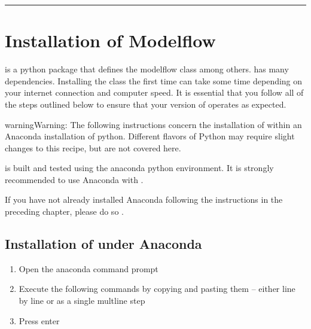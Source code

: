 \documentclass[letterpaper,10pt,english]{jupyterBook}
\begin{document}
\bigskip\hrule\bigskip


\sphinxstepscope


\section{Installation of Modelflow}
\label{\detokenize{content/03_Installation/InstallingModelFlow:installation-of-modelflow}}\label{\detokenize{content/03_Installation/InstallingModelFlow::doc}}
\sphinxAtStartPar
{} is a python package that defines the modelflow class  among others.   has many dependencies. Installing the class the first time can take some time depending on your internet connection and computer speed.  It is essential that you follow all of the steps outlined below to ensure that your version of  operates as expected.

\begin{sphinxadmonition}{warning}{Warning:}
\sphinxAtStartPar
The following instructions concern the installation of  within an Anaconda installation of python.  Different flavors of Python may require slight changes to this recipe, but are not covered here.

\sphinxAtStartPar
{} is built and tested using the anaconda python environment.  It is strongly recommended to use Anaconda with .

\sphinxAtStartPar
If you have not already installed Anaconda following the instructions in the preceding chapter, please do so .
\end{sphinxadmonition}


\subsection{Installation of  under Anaconda}
\label{\detokenize{content/03_Installation/InstallingModelFlow:installation-of-modelflow-under-anaconda}}\begin{enumerate}
%
\item {} 
\sphinxAtStartPar
Open the anaconda command prompt

\item {} 
\sphinxAtStartPar
Execute the following commands by copying and pasting them – either line by line or as a single mult\sphinxhyphen{}line step

\item {} 
\sphinxAtStartPar
Press enter

\end{enumerate}
\end{document}
